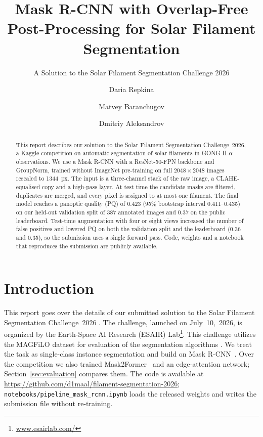 \documentclass[sigconf]{acmart}
\begin{document}
\title[Mask R-CNN for Solar Filament Segmentation]{Mask R-CNN with Overlap-Free Post-Processing for Solar Filament Segmentation}
\subtitle{A Solution to the Solar Filament Segmentation Challenge 2026} %

\author{Daria Repkina}

\author{Matvey Baranchugov}

\author{Dmitriy Aleksandrov}

\begin{abstract}
    This report describes our solution to the Solar Filament Segmentation Challenge~2026, a Kaggle competition on automatic segmentation of solar filaments in GONG H-$\alpha$ observations. We use a Mask R-CNN with a ResNet-50-FPN backbone and GroupNorm, trained without ImageNet pre-training on full $2048\times2048$ images rescaled to 1344~px. The input is a three-channel stack of the raw image, a CLAHE-equalised copy and a high-pass layer. At test time the candidate masks are filtered, duplicates are merged, and every pixel is assigned to at most one filament. The final model reaches a panoptic quality (PQ) of 0.423 (95\% bootstrap interval 0.411--0.435) on our held-out validation split of 387 annotated images and 0.37 on the public leaderboard. Test-time augmentation with four or eight views increased the number of false positives and lowered PQ on both the validation split and the leaderboard (0.36 and 0.35), so the submission uses a single forward pass. Code, weights and a notebook that reproduces the submission are publicly available.
\end{abstract}

\maketitle

\section{Introduction}
    This report goes over the details of our submitted solution to the Solar Filament Segmentation Challenge~2026 \cite{filament-segmentation-2026}. The challenge, launched on July~10,~2026, is organized by the Earth-Space AI Research (ESAIR) Lab\footnote{\href{https://www.esairlab.com/home}{www.esairlab.com/}}. This challenge utilizes the MAGFiLO dataset for evaluation of the segmentation algorithms \cite{ahmadzadeh2024dataset}.
    We treat the task as single-class instance segmentation and build on Mask R-CNN~\cite{he2017maskrcnn}. Over the competition we also trained Mask2Former~\cite{cheng2022mask2former} and an edge-attention network; Section~\ref{sec:evaluation} compares them. The code is available at \url{https://github.com/d1maal/filament-segmentation-2026}; \texttt{notebooks/pipeline\_mask\_rcnn.ipynb} loads the released weights and writes the submission file without re-training.
\end{document}

